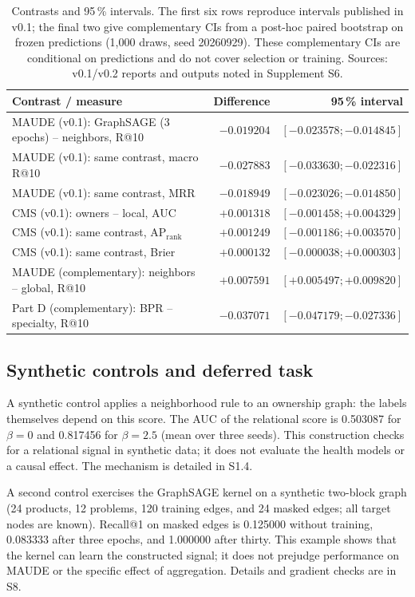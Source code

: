 \begin{table}[!htbp]
\centering\small
\caption{Contrasts and 95\,\% intervals. The first six rows reproduce intervals published in v0.1; the final two give complementary CIs from a post-hoc paired bootstrap on frozen predictions (1,000 draws, seed 20260929). These complementary CIs are conditional on predictions and do not cover selection or training. Sources: v0.1/v0.2 reports and outputs noted in Supplement S6\cite{hgbresults}.}
\label{tab:ci}
\begin{tabularx}{\linewidth}{@{}Xrr@{}}
\toprule
Contrast / measure & Difference & 95\,\% interval\\
\midrule
MAUDE (v0.1): GraphSAGE (3 epochs) -- neighbors, R@10 & $-0.019204$ & $[-0.023578;-0.014845]$\\
MAUDE (v0.1): same contrast, macro R@10 & $-0.027883$ & $[-0.033630;-0.022316]$\\
MAUDE (v0.1): same contrast, MRR & $-0.018949$ & $[-0.023026;-0.014850]$\\
CMS (v0.1): owners -- local, AUC & $+0.001318$ & $[-0.001458;+0.004329]$\\
CMS (v0.1): same contrast, $\mathrm{AP}_{\mathrm{rank}}$ & $+0.001249$ & $[-0.001186;+0.003570]$\\
CMS (v0.1): same contrast, Brier & $+0.000132$ & $[-0.000038;+0.000303]$\\
MAUDE (complementary): neighbors -- global, R@10 & $+0.007591$ & $[+0.005497;+0.009820]$\\
Part D (complementary): BPR -- specialty, R@10 & $-0.037071$ & $[-0.047179;-0.027336]$\\
\bottomrule
\end{tabularx}
\end{table}

\subsection{Synthetic controls and deferred task}

A synthetic control applies a neighborhood rule to an ownership graph: the labels themselves depend on this score. The AUC of the relational score is 0.503087 for $\beta=0$ and 0.817456 for $\beta=2.5$ (mean over three seeds)\cite{hgbcontrols}. This construction checks for a relational signal in synthetic data; it does not evaluate the health models or a causal effect. The mechanism is detailed in S1.4.

A second control exercises the GraphSAGE kernel on a synthetic two-block graph (24 products, 12 problems, 120 training edges, and 24 masked edges; all target nodes are known)\cite{hgbcode}. Recall@1 on masked edges is 0.125000 without training, 0.083333 after three epochs, and 1.000000 after thirty. This example shows that the kernel can learn the constructed signal; it does not prejudge performance on MAUDE or the specific effect of aggregation. Details and gradient checks are in S8.

